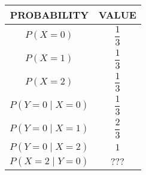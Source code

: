 \begin{tabular}{|c|c|}
\hline
 \textbf{PROBABILITY} & \textbf{VALUE}\\
\hline
  $P( X = 0)$ & $\displaystyle  \dfrac{1}{3}$ \\
\hline
  $P( X = 1)$ & $\displaystyle  \dfrac{1}{3}$ \\
\hline
 $P( X = 2)$ & $\displaystyle  \dfrac{1}{3}$ \\
\hline
 $P( Y = 0 \mid X = 0)$ & $\displaystyle  \dfrac{1}{3}$ \\
\hline
 $P( Y = 0 \mid X = 1 )$ & $\displaystyle  \dfrac{2}{3}$ \\
\hline
 $P( Y = 0 \mid X = 2)$ & $1$ \\
\hline
 $P( X = 2 \mid Y = 0)$ & $???$ \\
\hline
\end{tabular}\\
